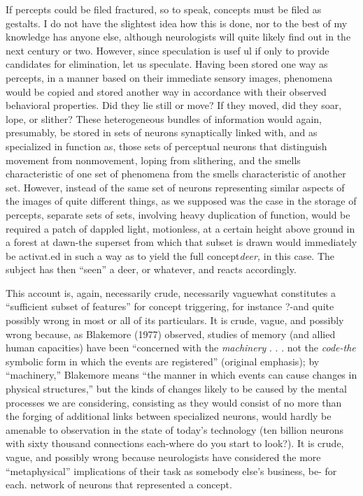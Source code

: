 If percepts could be filed fractured, so to speak, concepts must
be filed as gestalts. I do not have the slightest idea how this is done, nor to the best of my knowledge has anyone else, although neurologists will quite likely find out in the next century or two. However, since speculation is usef ul if only to provide candidates for elimination, let us speculate. Having been stored one way as percepts, in a manner based on their immediate sensory images, phenomena would be copied and stored another way in accordance with their observed behavioral properties. Did they lie still or move? If they moved, did they soar, lope, or slither? These heterogeneous bundles of information would again, presumably, be stored in sets of neurons synaptically linked with, and as specialized in function as, those sets of perceptual neurons that distinguish movement from nonmovement, loping from slithering, and the smells characteristic of one set of phenomena from the smells characteristic of another set. However, instead of the same set of neurons representing similar aspects of the images of quite different things, as we supposed was the case in the storage of percepts, separate
sets of sets, involving heavy duplication of function, would be required
a patch of dappled light, motionless, at a certain height above ground in a forest at dawn{}-the superset from which that subset is drawn would immediately be activat.ed in such a way as to yield the full concept\-\textit{deer,} in this case. The subject has then ``seen'' a deer, or whatever, and reacts accordingly.

This account is, again, necessarily crude, necessarily vague\-what constitutes a ``sufficient subset of features'' for concept trig\-gering, for instance ?-and quite possibly wrong in most or all of its particulars. It is crude, vague, and possibly wrong because, as Blake\-more (1977) observed, studies of memory (and allied human capacities) have been ``concerned with the \textit{machinery} . . . not the \textit{code-the }sym\-bolic form in which the events are registered'' (original emphasis); by ``machinery,'' Blakemore means ``the manner in which events can cause changes in physical structures,'' but the kinds of changes likely to be caused by the mental processes we are considering, consisting as they would consist of no more than the forging of additional links between specialized neurons, would hardly be amenable to observation in the state of today's technology (ten billion neurons with sixty thousand connections each-where do you start to look?). It is crude, vague, and possibly wrong because neurologists have considered the more ``meta\-physical'' implications of their task as somebody else's business, be-
for each. network of neurons that represented a concept.

